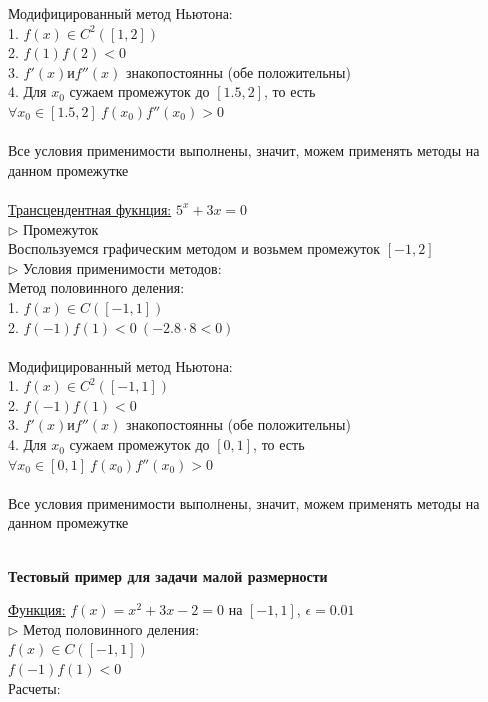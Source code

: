 \documentclass{article}
\begin{document}
	Модифицированный метод Ньютона:\\
	1. $f(x) \in C^2([1, 2])$\\
	2. $f(1)f(2) < 0$\\
	3. $f'(x) и f''(x)$ знакопостоянны (обе положительны)\\
	4. Для $x_0$ сужаем промежуток до $[1.5, 2]$, то есть $\forall x_0 \in [1.5, 2]\ f(x_0)f''(x_0) > 0$\\
	\\
	Все условия применимости выполнены, значит, можем применять методы на данном промежутке\\
	\\
	\underline{Трансцендентная фукнция:}
	$5^x + 3x = 0$\\
	$\triangleright$ Промежуток\\
	Воспользуемся графическим методом и возьмем промежуток $[-1, 2]$\\ 
	$\triangleright$ Условия применимости методов:\\
	Метод половинного деления:\\
	1. $f(x) \in C([-1, 1])$\\
	2. $f(-1)f(1) < 0\ (-2.8 \cdot 8 < 0)$\\
	\\
	Модифицированный метод Ньютона:\\
	1. $f(x) \in C^2([-1, 1])$\\
	2. $f(-1)f(1) < 0$\\
	3. $f'(x) и f''(x)$ знакопостоянны (обе положительны)\\
	4. Для $x_0$ сужаем промежуток до $[0, 1]$, то есть $\forall x_0 \in [0, 1]\ f(x_0)f''(x_0) > 0$\\
	\\
	Все условия применимости выполнены, значит, можем применять методы на данном промежутке\\
	\\
	\newpage
	\begin{center} \textbf{Тестовый пример для задачи малой размерности}\end{center}
	\underline{Функция:} $f(x) = x^2 + 3x - 2 = 0$ на $[-1, 1]$, $\epsilon = 0.01$\\
	$\triangleright$ Метод половинного деления:\\
	$f(x) \in C([-1, 1])$\\
	$f(-1)f(1) < 0$\\
	Расчеты:
\end{document}
